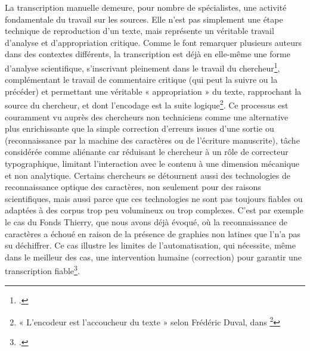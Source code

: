La transcription manuelle demeure, pour nombre de spécialistes, une activité fondamentale du travail sur les sources. Elle n’est pas simplement une étape technique de reproduction d’un texte, mais représente un véritable travail d’analyse et d’appropriation critique. Comme le font remarquer plusieurs auteurs dans des contextes différents, la transcription est déjà en elle-même une forme d’analyse scientifique, s’inscrivant pleinement dans le travail du chercheur\footcite[p.80]{dufournaud_humanites_2014}, complémentant le travail de commentaire critique (qui peut la suivre ou la précéder) et permettant une véritable « appropriation » du texte, rapprochant la source du chercheur, et dont l’encodage est la suite logique\footnote{« L’encodeur est l’accoucheur du texte » selon Frédéric Duval, dans \footcite[p.15]{duval_pour_2017}}. 
Ce processus est couramment vu auprès des chercheurs non techniciens comme une alternative plus enrichissante que la simple correction d’erreurs issues d’une sortie \ocr ou \htr (reconnaissance par la machine des caractères ou de l’écriture manuscrite), tâche considérée comme aliénante car réduisant le chercheur à un rôle de correcteur typographique, limitant l'interaction avec le contenu à une dimension mécanique et non analytique. Certains chercheurs se détournent aussi des technologies de reconnaissance optique des caractères, non seulement pour des raisons scientifiques, mais aussi parce que ces technologies ne sont pas toujours fiables ou adaptées à des corpus trop peu volumineux ou trop complexes. C’est par exemple le cas du Fonds Thierry, que nous avons déjà évoqué, où la reconnaissance de caractères a échoué en raison de la présence de graphies non latines que l’\ocr n’a pas su déchiffrer. Ce cas illustre les limites de l’automatisation, qui nécessite, même dans le meilleur des cas, une intervention humaine (correction) pour garantir une transcription fiable\footcite{chague_intelligence_2022}.

